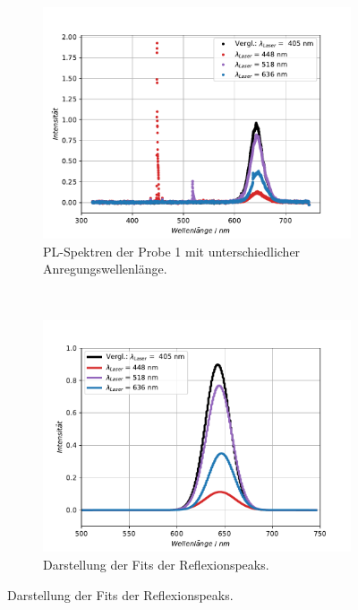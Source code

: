 \begin{figure}[hbtp]
\centering
\caption{Messungen und Ergebnisse zur Probe 1.}
	\begin{subfigure}[t]{0.45\textwidth}
	\includegraphics[width=\textwidth]{Plots/aufgabe2P1.pdf}
	\caption{PL-Spektren der Probe 1 mit unterschiedlicher Anregungswellenl\"{a}nge.}
	\label{}
	\end{subfigure}
	~
	\begin{subfigure}[t]{0.45\textwidth}
	\includegraphics[width=\textwidth]{Plots/aufgabe2P1_fit_1s.pdf}
	\caption{Darstellung der Fits der Reflexionspeaks.}
	\label{}
	\end{subfigure}
\label{}
\end{figure}


